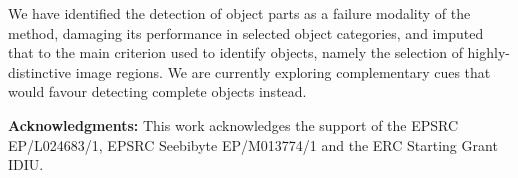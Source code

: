 \documentclass[10pt,twocolumn,letterpaper]{article}
\begin{document}
We have identified the detection of object parts as a failure modality of the method, damaging its performance in selected object categories, and imputed that to the main criterion used to identify objects, namely the selection of highly-distinctive image regions. We are currently exploring complementary cues that would favour detecting complete objects instead.
 

{\small
\textbf{Acknowledgments:} This work acknowledges the support of the EPSRC EP/L024683/1, EPSRC Seebibyte EP/M013774/1 and the ERC Starting Grant IDIU. 
}

\clearpage
{
\small


}
\end{document}
